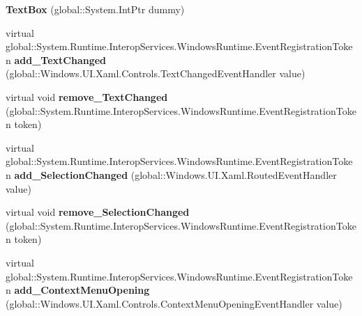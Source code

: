 \begin{DoxyCompactItemize}
{\bfseries Text\+Box} (global\+::\+System.\+Int\+Ptr dummy)
\item 
\mbox{\label{class_windows_1_1_u_i_1_1_xaml_1_1_controls_1_1_text_box_a206b2889087ba0dbfe818431045788ff}} 
virtual global\+::\+System.\+Runtime.\+Interop\+Services.\+Windows\+Runtime.\+Event\+Registration\+Token {\bfseries add\+\_\+\+Text\+Changed} (global\+::\+Windows.\+U\+I.\+Xaml.\+Controls.\+Text\+Changed\+Event\+Handler value)
\item 
\mbox{\label{class_windows_1_1_u_i_1_1_xaml_1_1_controls_1_1_text_box_a35ae456324ad400806b770d7c47c57b4}} 
virtual void {\bfseries remove\+\_\+\+Text\+Changed} (global\+::\+System.\+Runtime.\+Interop\+Services.\+Windows\+Runtime.\+Event\+Registration\+Token token)
\item 
\mbox{\label{class_windows_1_1_u_i_1_1_xaml_1_1_controls_1_1_text_box_aa7a814e90af6bc70d3d39b87e1dcc130}} 
virtual global\+::\+System.\+Runtime.\+Interop\+Services.\+Windows\+Runtime.\+Event\+Registration\+Token {\bfseries add\+\_\+\+Selection\+Changed} (global\+::\+Windows.\+U\+I.\+Xaml.\+Routed\+Event\+Handler value)
\item 
\mbox{\label{class_windows_1_1_u_i_1_1_xaml_1_1_controls_1_1_text_box_ab695fdfc9633cf4e369d19dceb2d3327}} 
virtual void {\bfseries remove\+\_\+\+Selection\+Changed} (global\+::\+System.\+Runtime.\+Interop\+Services.\+Windows\+Runtime.\+Event\+Registration\+Token token)
\item 
\mbox{\label{class_windows_1_1_u_i_1_1_xaml_1_1_controls_1_1_text_box_ab836344ac1b9e4cb88bf838f48407e7c}} 
virtual global\+::\+System.\+Runtime.\+Interop\+Services.\+Windows\+Runtime.\+Event\+Registration\+Token {\bfseries add\+\_\+\+Context\+Menu\+Opening} (global\+::\+Windows.\+U\+I.\+Xaml.\+Controls.\+Context\+Menu\+Opening\+Event\+Handler value)
\item 
\mbox{\label{class_windows_1_1_u_i_1_1_xaml_1_1_controls_1_1_text_box_ad3a3c299db3a774e1db87983c4ee1b5c}} 

\end{DoxyCompactItemize}
